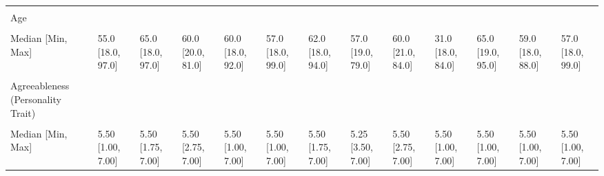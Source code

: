 \documentclass[
  single column]{article}
\begin{document}
\begin{landscape}
\begin{longtable}[t]{lllllllllllll}
\endfoot
\bottomrule
\endlastfoot
\cellcolor{gray!10}{} & \cellcolor{gray!10}{(N=21551)} & \cellcolor{gray!10}{(N=1363)} & \cellcolor{gray!10}{(N=270)} & \cellcolor{gray!10}{(N=2017)} & \cellcolor{gray!10}{(N=3696)} & \cellcolor{gray!10}{(N=1095)} & \cellcolor{gray!10}{(N=136)} & \cellcolor{gray!10}{(N=87)} & \cellcolor{gray!10}{(N=658)} & \cellcolor{gray!10}{(N=576)} & \cellcolor{gray!10}{(N=744)} & \cellcolor{gray!10}{(N=32193)}\\
Age &  &  &  &  &  &  &  &  &  &  &  & \\
\cellcolor{gray!10}{Mean (SD)} & \cellcolor{gray!10}{51.6 (16.8)} & \cellcolor{gray!10}{63.3 (12.2)} & \cellcolor{gray!10}{56.2 (14.2)} & \cellcolor{gray!10}{56.4 (15.1)} & \cellcolor{gray!10}{53.0 (16.6)} & \cellcolor{gray!10}{59.1 (14.4)} & \cellcolor{gray!10}{52.0 (17.5)} & \cellcolor{gray!10}{54.7 (16.3)} & \cellcolor{gray!10}{33.8 (12.6)} & \cellcolor{gray!10}{64.1 (11.5)} & \cellcolor{gray!10}{54.2 (16.7)} & \cellcolor{gray!10}{52.8 (16.7)}\\
Median [Min, Max] & 55.0 [18.0, 97.0] & 65.0 [18.0, 97.0] & 60.0 [20.0, 81.0] & 60.0 [18.0, 92.0] & 57.0 [18.0, 99.0] & 62.0 [18.0, 94.0] & 57.0 [19.0, 79.0] & 60.0 [21.0, 84.0] & 31.0 [18.0, 84.0] & 65.0 [19.0, 95.0] & 59.0 [18.0, 88.0] & 57.0 [18.0, 99.0]\\
\cellcolor{gray!10}{Missing} & \cellcolor{gray!10}{0 (0\%)} & \cellcolor{gray!10}{0 (0\%)} & \cellcolor{gray!10}{0 (0\%)} & \cellcolor{gray!10}{0 (0\%)} & \cellcolor{gray!10}{1 (0.0\%)} & \cellcolor{gray!10}{0 (0\%)} & \cellcolor{gray!10}{0 (0\%)} & \cellcolor{gray!10}{0 (0\%)} & \cellcolor{gray!10}{21 (3.2\%)} & \cellcolor{gray!10}{0 (0\%)} & \cellcolor{gray!10}{0 (0\%)} & \cellcolor{gray!10}{22 (0.1\%)}\\
\addlinespace
Agreeableness (Personality Trait) &  &  &  &  &  &  &  &  &  &  &  & \\
\cellcolor{gray!10}{Mean (SD)} & \cellcolor{gray!10}{5.30 (1.03)} & \cellcolor{gray!10}{5.46 (0.952)} & \cellcolor{gray!10}{5.49 (0.932)} & \cellcolor{gray!10}{5.34 (1.00)} & \cellcolor{gray!10}{5.44 (1.00)} & \cellcolor{gray!10}{5.38 (1.01)} & \cellcolor{gray!10}{5.36 (0.871)} & \cellcolor{gray!10}{5.47 (0.984)} & \cellcolor{gray!10}{5.30 (1.05)} & \cellcolor{gray!10}{5.39 (0.950)} & \cellcolor{gray!10}{5.36 (1.03)} & \cellcolor{gray!10}{5.34 (1.02)}\\
Median [Min, Max] & 5.50 [1.00, 7.00] & 5.50 [1.75, 7.00] & 5.50 [2.75, 7.00] & 5.50 [1.00, 7.00] & 5.50 [1.00, 7.00] & 5.50 [1.75, 7.00] & 5.25 [3.50, 7.00] & 5.50 [2.75, 7.00] & 5.50 [1.00, 7.00] & 5.50 [1.00, 7.00] & 5.50 [1.00, 7.00] & 5.50 [1.00, 7.00]\\

\end{longtable}
\end{landscape}
\end{document}
